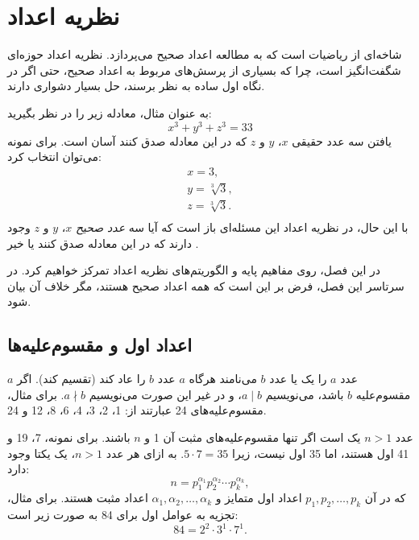 \chapter{نظریه اعداد}


 شاخه‌ای از ریاضیات است
که به مطالعه اعداد صحیح می‌پردازد.
نظریه اعداد حوزه‌ای شگفت‌انگیز است،
چرا که بسیاری از پرسش‌های مربوط به اعداد صحیح،
حتی اگر در نگاه اول ساده به نظر برسند،
حل بسیار دشواری دارند.

به عنوان مثال، معادله زیر را در نظر بگیرید:
\[x^3 + y^3 + z^3 = 33\]
یافتن سه عدد حقیقی $x$، $y$ و $z$
که در این معادله صدق کنند آسان است.
برای نمونه می‌توان انتخاب کرد:
\[
\begin{array}{lcl}
x = 3, \\
y = \sqrt[3]{3}, \\
z = \sqrt[3]{3}.\\
\end{array}
\]
با این حال، در نظریه اعداد این مسئله‌ای باز است
که آیا سه \emph{عدد صحیح} $x$، $y$ و $z$ وجود دارند
که در این معادله صدق کنند یا خیر \cite{bec07}.

در این فصل، روی مفاهیم پایه
و الگوریتم‌های نظریه اعداد تمرکز خواهیم کرد.
در سرتاسر این فصل، فرض بر این است که همه اعداد
صحیح هستند، مگر خلاف آن بیان شود.

\section{اعداد اول و مقسوم‌علیه‌ها}


عدد $a$ را یک  یا  عدد $b$ می‌نامند
هرگاه $a$ عدد $b$ را عاد کند (تقسیم کند).
اگر $a$ مقسوم‌علیه $b$ باشد،
می‌نویسیم $a \mid b$، و در غیر این صورت می‌نویسیم $a \nmid b$.
برای مثال، مقسوم‌علیه‌های 24 عبارتند از:
1، 2، 3، 4، 6، 8، 12 و 24.


عدد $n>1$ یک  است
اگر تنها مقسوم‌علیه‌های مثبت آن 1 و $n$ باشند.
برای نمونه، 7، 19 و 41 اول هستند،
اما 35 اول نیست، زیرا $5 \cdot 7 = 35$.
به ازای هر عدد $n>1$، یک  یکتا وجود دارد:
\[ n = p_1^{\alpha_1} p_2^{\alpha_2} \cdots p_k^{\alpha_k},\]
که در آن $p_1,p_2,\ldots,p_k$ اعداد اول متمایز و
$\alpha_1,\alpha_2,\ldots,\alpha_k$ اعداد مثبت هستند.
برای مثال، تجزیه به عوامل اول برای 84 به صورت زیر است:
\[84 = 2^2 \cdot 3^1 \cdot 7^1.\]

